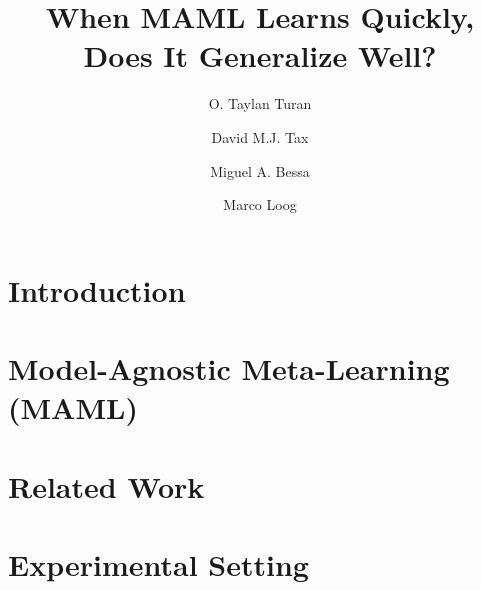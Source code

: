\documentclass[runningheads]{llncs}
\newcommand{\version}{v3/}
\begin{document}
%
\title{When MAML Learns Quickly, Does It Generalize Well?}
%
%

\author{O. Taylan Turan\and
David M.J. Tax\and
Miguel A. Bessa\and
Marco Loog}
%
%

%
\maketitle              %


\begin{abstract}
  
\end{abstract}



\section{Introduction}\label{sec:intro}
  
\section{Model-Agnostic Meta-Learning (MAML)}\label{sec:maml}
  
\section{Related Work}\label{sec:rw}
  
\section{Experimental Setting}\label{sec:methods}
  
\end{document}
